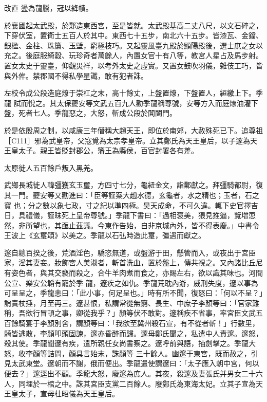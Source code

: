 \begin{pinyinscope}
 改直
 盪為龍騰，冠以絳幘。



 於襄國起太武殿，於鄴造東西宮，至是皆就。太武殿基高二丈八尺，以文石碎之，下穿伏室，置衛士五百人於其中。東西七十五步，南北六十五步。皆漆瓦、金鐺、銀楹、金柱、珠簾、玉壁，窮極枝巧。又起靈風臺九殿於顯陽殿後，選士庶之女以充之。後庭服綺縠、玩珍奇者萬餘人，內置女官十有八等，教宮人星占及馬步射。置女太史于靈臺，仰觀災祥，以考外太史之虛實。又置女鼓吹羽儀，雜伎工巧，皆與外侔。禁郡國不得私學星讖，敢有犯者誅。



 左校令成公段造庭燎于崇杠之末，高十餘丈，上盤置燎，下盤置人，絙繳上下。季龍
 試而悅之。其太保夔安等文武五百九人勸季龍稱尊號，安等方入而庭燎油灌下盤，死者七人。季龍惡之，大怒，斬成公段於閶闔門。



 於是依殷周之制，以咸康三年僭稱大趙天王，即位於南郊，大赦殊死已下。追尊祖［C111］邪為武皇帝，父寇覓為太宗孝皇帝。立其鄭氏為天王皇后，以子邃為天王皇太子。親王皆貶封郡公，籓王為縣侯，百官封署各有差。



 太原徙人五百餘戶叛入黑羌。



 武鄉長城徙人韓彊獲玄玉璽，方四寸七分，龜紐金文，詣鄴獻之。拜彊騎都尉，復其一門。夔安等又勸進曰：「臣等謹案大趙水德，玄龜者，水之精也；玉者，石之寶
 也；分之數以象七政，寸之紀以準四極。昊天成命，不可久違。輒下史官擇吉日，具禮儀，謹昧死上皇帝尊號。」季龍下書曰：「過相褒美，猥見推逼，覽增恧然，非所望也，其亟止茲議。今東作告始，自非京城內外，皆不得表慶。」中書令王波上《玄璽頌》以美之。季龍以石弘時造此璽，彊遇而獻之。



 邃自總百揆之後，荒酒淫色，驕恣無道，或盤游于田，懸管而入，或夜出于宮臣家，淫其妻妾。妝飾宮人美淑者，斬首洗血，置於盤上，傳共視之。又內諸比丘尼有姿色者，與其交褻而殺之，合牛羊肉煮而食之，亦賜左右，欲以識其味也。河間公宣、樂安公韜有寵於季
 龍，邃疾之如仇。季龍荒耽內游，威刑失度，邃以事為可呈呈之，季龍恚曰：「此小事，何足呈也。」時有所不聞，復怒曰：「何以不呈？」誚責杖捶，月至再三。邃甚恨，私謂常從無窮、長生、中庶子李顏等曰：「官家難稱，吾欲行冒頓之事，卿從我乎？」顏等伏不敢對。邃稱疾不省事，率宮臣文武五百餘騎宴于李顏別舍，謂顏等曰：「我欲至冀州殺石宣，有不從者斬！」行數里，騎皆逃散，李顏叩頭固諫，邃亦昏醉而歸。邃母鄭氏聞之，私遣中人責邃。邃怒，殺其使。季龍聞邃有疾，遣所親任女尚書察之。邃呼前與語，抽劍擊之。季龍大怒，收李顏等詰問，顏具言始末，誅顏等
 三十餘人。幽邃于東宮，既而赦之，引見太武東堂。邃朝而不謝，俄而便出。季龍遣使謂邃曰：「太子應入朝中宮，何以便去？」邃逕出不顧。季龍大怒，廢邃為庶人。其夜，殺邃及妻張氏并男女二十六人，同埋於一棺之中。誅其宮臣支黨二百餘人。廢鄭氏為東海太妃。立其子宣為天王皇太子，宣母杜昭儀為天王皇后。




\end{pinyinscope}
